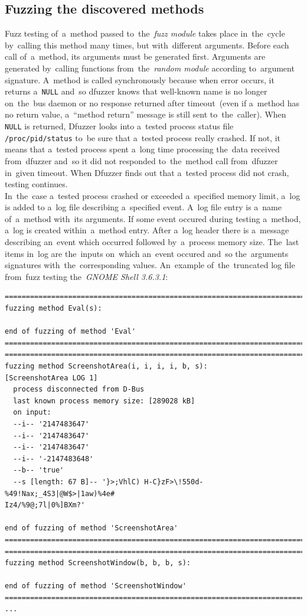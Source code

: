 \documentclass[conference]{IEEEtran}
\begin{document}
\subsection{Fuzzing the discovered methods}
Fuzz testing of~a~method passed to~the~\emph{fuzz module} takes place
in~the~cycle by~calling this method many times, but with~different arguments.
Before each call of~a~method, its arguments must be generated first. Arguments
are generated by~calling functions from~the~\emph{random module} according
to~argument signature.  A~method is called synchronously because when error
occurs, it returns a~\texttt{NULL} and~so dfuzzer knows that well-known name is
no longer on~the~bus daemon or no response returned after timeout~(even if
a~method has no return value, a~``method return'' message is still sent
to~the~caller). When \texttt{NULL} is returned, Dfuzzer looks into a~tested
process status file \texttt{/proc/pid/status} to~be sure that a~tested process
really crashed. If not, it means that a~tested process spent a~long time
processing the~data received from~dfuzzer and~so it did not responded
to~the~method call from~dfuzzer in~given timeout. When Dfuzzer finds out that
a~tested process did not crash, testing continues.\\


In~the~case a~tested process crashed or exceeded a~specified memory limit,
a~log is added to a~log file describing a~specified event. A~log file entry
is a~name of~a~method with~its arguments. If some event occured during testing
a~method, a~log is created within~a~method entry. After a~log header there is a~message describing
an~event which occurred followed by~a~process memory size. The~last items in~log
are the~inputs on~which an~event occured and~so the~arguments signatures
with~the~corresponding values. An~example of~the~truncated log file from~fuzz
testing the~\emph{GNOME Shell 3.6.3.1}:
\begin{verbatim}
===========================================================================
fuzzing method Eval(s):

end of fuzzing of method 'Eval'
===========================================================================
===========================================================================
fuzzing method ScreenshotArea(i, i, i, i, b, s):
[ScreenshotArea LOG 1]
  process disconnected from D-Bus
  last known process memory size: [289028 kB]
  on input:
  --i-- '2147483647'
  --i-- '2147483647'
  --i-- '2147483647'
  --i-- '-2147483648'
  --b-- 'true'
  --s [length: 67 B]-- '}>;VhlC) H-C}zF>\!550d-%49!Nax;_4S3|@W$>|1aw)%4e#
Iz4/%9@;7l|0%]BXm?'

end of fuzzing of method 'ScreenshotArea'
===========================================================================
===========================================================================
fuzzing method ScreenshotWindow(b, b, b, s):

end of fuzzing of method 'ScreenshotWindow'
===========================================================================
...
\end{verbatim}
\end{document}
